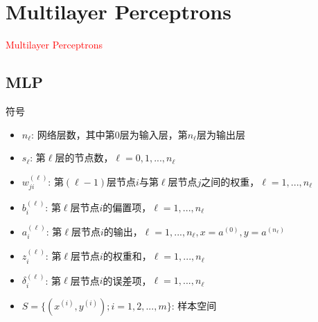 \section{Multilayer Perceptrons}
\label{sec:mlp}

\begin{frame}
  \begin{center}
    \Huge{\textcolor{red}{Multilayer Perceptrons}}
  \end{center}
\end{frame}

\subsection{MLP}

\begin{frame}{符号}
 \begin{itemize}
   \item \alert{$ {n_{\ell}} $}: 网络层数，其中第$0$层为输入层，第$n_{\ell}$层为输出层
   \item \alert{$ {s_{\ell}} $}: 第$\ell$层的节点数，$ \ell = 0, 1, ..., n_{\ell} $
   \item \alert{$ w_{ji}^{(\ell)} $}: 第$(\ell-1)$层节点$i$与第$\ell$层节点$j$之间的权重，$ \ell = 1, ..., n_{\ell} $
   \item \alert{$ b_i^{(\ell)} $}: 第$\ell$层节点$i$的偏置项，$ \ell = 1, ..., n_{\ell} $
   \item \alert{$ a_i^{(\ell)} $}: 第$\ell$层节点$i$的输出，$ \ell = 1, ..., n_{\ell}, x = a^{(0)}, y = a^{(n_{\ell})} $
   \item \alert{$ z_i^{(\ell)} $}: 第$\ell$层节点$i$的权重和，$ \ell = 1, ..., n_{\ell} $
   \item \alert{$ \delta _i^{(\ell)} $}: 第$\ell$层节点$i$的误差项，$ \ell = 1, ..., n_{\ell} $
   \item \alert{$ S = \{ ({x^{(i)}},{y^{(i)}});i = 1,2,...,m\} $}: 样本空间
 \end{itemize}
\end{frame}

